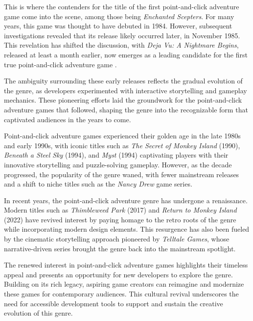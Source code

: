 This is where the contenders for the title of the first point-and-click adventure game come into the scene, among those being \textit{Enchanted Scepters}. For many years, this game was thought to have debuted in 1984. However, subsequent investigations revealed that its release likely occurred later, in November 1985. This revelation has shifted the discussion, with \textit{Deja Vu: A Nightmare Begins}, released at least a month earlier, now emerges as a leading candidate for the first true point-and-click adventure game \cite{Pfenning2024}.

The ambiguity surrounding these early releases reflects the gradual evolution of the genre, as developers experimented with interactive storytelling and gameplay mechanics. These pioneering efforts laid the groundwork for the point-and-click adventure games that followed, shaping the genre into the recognizable form that captivated audiences in the years to come.

Point-and-click adventure games experienced their golden age in the late 1980s and early 1990s, with iconic titles such as \textit{The Secret of Monkey Island} (1990), \textit{Beneath a Steel Sky} (1994), and \textit{Myst} (1994) captivating players with their innovative storytelling and puzzle-solving gameplay. However, as the decade progressed, the popularity of the genre waned\cite{Qaffas202022}, with fewer mainstream releases and a shift to niche titles such as the \textit{Nancy Drew} game series.

In recent years, the point-and-click adventure genre has undergone a renaissance. Modern titles such as \textit{Thimbleweed Park} (2017) and \textit{Return to Monkey Island} (2022) have revived interest by paying homage to the retro roots of the genre while incorporating modern design elements. This resurgence has also been fueled by the cinematic storytelling approach pioneered by \textit{Telltale Games}, whose narrative-driven series brought the genre back into the mainstream spotlight.

The renewed interest in point-and-click adventure games highlights their timeless appeal and presents an opportunity for new developers to explore the genre. Building on its rich legacy, aspiring game creators can reimagine and modernize these games for contemporary audiences. This cultural revival underscores the need for accessible development tools to support and sustain the creative evolution of this genre.
